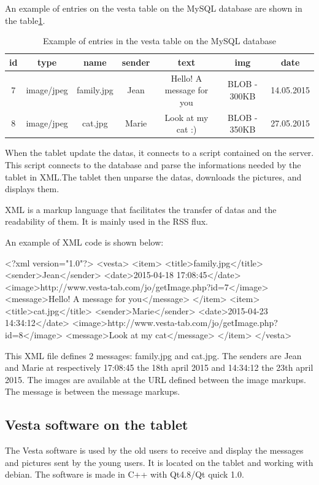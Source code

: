 An example of entries on the vesta table on the MySQL database are shown in the table\ref{tab:database}.

\begin{table}
\begin{tabular}{|c|c|c|c|c|c|c|}
  \hline
  id & type & name & sender & text & img & date \\
  \hline
  7 & image/jpeg & family.jpg & Jean & Hello! A message for you & BLOB - 300KB & 14.05.2015\\
  8 & image/jpeg & cat.jpg & Marie & Look at my cat :) & BLOB - 350KB & 27.05.2015\\
  \hline
\end{tabular}
\caption {Example of entries in the vesta table on the MySQL database}\label{tab:database}
\end{table}

When the tablet update the datas, it connects to a script contained on the server. This script connects to the database and parse the informations needed by the tablet in XML.The tablet then unparse the datas, downloads the pictures, and displays them.

XML is a markup language that facilitates the transfer of datas and the readability of them. It is mainly used in the RSS flux.


An example of XML code is shown below:

<?xml version="1.0"?>
<vesta>
  <item>
    <title>family.jpg</title>
    <sender>Jean</sender>
    <date>2015-04-18 17:08:45</date>    
    <image>http://www.vesta-tab.com/jo/getImage.php?id=7</image>
    <message>Hello! A message for you</message>
  </item>
  <item>
    <title>cat.jpg</title>
    <sender>Marie</sender>
    <date>2015-04-23 14:34:12</date>
    <image>http://www.vesta-tab.com/jo/getImage.php?id=8</image>
    <message>Look at my cat</message>
  </item>
</vesta>

This XML file defines 2 messages: family.jpg and cat.jpg. The senders are Jean and Marie at respectively 17:08:45 the 18th april 2015 and 14:34:12 the 23th april 2015. The images are available at the URL defined between the image markups. The message is between the message markups.

\subsection{Vesta software on the tablet}
The Vesta software is used by the old users to receive and display the messages and pictures sent by the young users. It is located on the tablet and working with debian. The software is made in C++ with Qt4.8/Qt quick 1.0.

